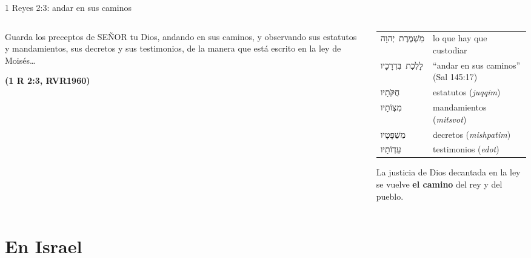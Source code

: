 \documentclass[hyperref={bookmarks=false},aspectratio=169]{beamer}
\newcommand{\heb}[1]{\mbox{\foreignlanguage{hebrew}{#1}}}
\newcommand{\SENOR}{S{\fontsize{0.78em}{1em}\selectfont EÑOR}}
\newcommand{\fuente}[1]{\par\hfill{\upshape\bfseries\footnotesize\textcolor{azul}{#1}}}
\newcommand{\destacar}[1]{\textbf{\textcolor{azul}{#1}}}
\begin{document}
\begin{frame}{1 Reyes 2:3: andar en sus caminos}
\begin{columns}[c,onlytextwidth]
\begin{column}{0.52\textwidth}
\begin{cita}Guarda los preceptos de \SENOR{} tu Dios, andando en sus caminos, y observando sus estatutos y mandamientos, sus decretos y sus testimonios, de la manera que está escrito en la ley de Moisés\ldots\fuente{(1 R 2:3, RVR1960)}\end{cita}
\end{column}
\begin{column}{0.46\textwidth}
\scriptsize\renewcommand{\arraystretch}{1.12}
\begin{tabular}{@{}>{\RaggedRight\arraybackslash}p{2.2cm}>{\RaggedRight\arraybackslash}p{3.0cm}@{}}
\toprule
\heb{מִשְׁמֶרֶת יְהוָה} & lo que hay que custodiar \\
\heb{לָלֶכֶת בִּדְרָכָיו} & ``andar en sus caminos'' (Sal 145:17) \\
\heb{חֻקֹּתָיו} & estatutos (\emph{juqqim}) \\
\heb{מִצְוֹתָיו} & mandamientos (\emph{mitsvot}) \\
\heb{מִשְׁפָּטָיו} & decretos (\emph{mishpatim}) \\
\heb{עֵדְוֹתָיו} & testimonios (\emph{edot}) \\
\bottomrule
\end{tabular}\par\smallskip
\small La justicia de Dios decantada en la ley se vuelve \destacar{el camino} del rey y del pueblo.
\end{column}
\end{columns}
\end{frame}

\section{En Israel}
\end{document}
